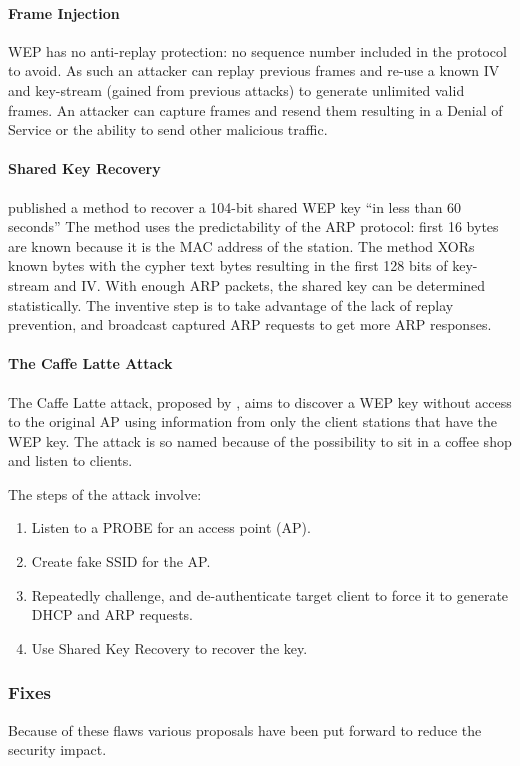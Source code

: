 \documentclass[pdftex, 12pt, a4paper]{article}
\begin{document}
\paragraph{Frame Injection}
WEP has no anti-replay protection: no sequence number included in the protocol to avoid. As such an attacker can replay previous frames and re-use a known IV and key-stream (gained from previous attacks) to generate unlimited valid frames.  An attacker can capture frames and resend them resulting in a Denial of Service or the ability to send other malicious traffic.

\paragraph{Shared Key Recovery}
\textcite{tews2007breaking} published a method to recover a 104-bit shared WEP key ``in less than 60 seconds''  The method uses the predictability of the ARP protocol: first 16 bytes are known because it is the MAC address of the station.
The method XORs known bytes with the cypher text bytes resulting in the first 128 bits of key-stream and IV. With enough ARP packets, the shared key can be determined statistically.
The inventive step is to take advantage of the lack of replay prevention, and broadcast captured ARP requests to get more ARP responses.

\paragraph{The Caffe Latte Attack}
The Caffe Latte attack, proposed by \textcite{cafe}, aims to discover a WEP key without access to the original AP using information from only the client stations that have the WEP key. The attack is so named because of the possibility to sit in a coffee shop and listen to clients.

The steps of the attack involve:
\begin{enumerate}
    \item Listen to a PROBE for an access point (AP).
    \item Create fake SSID for the AP.
    \item Repeatedly challenge, and de-authenticate target client to force it to generate DHCP and ARP requests.
    \item Use Shared Key Recovery to recover the key.
\end{enumerate}

\subsubsection{Fixes}
Because of these flaws various proposals have been put forward to reduce the security impact.
\end{document}
